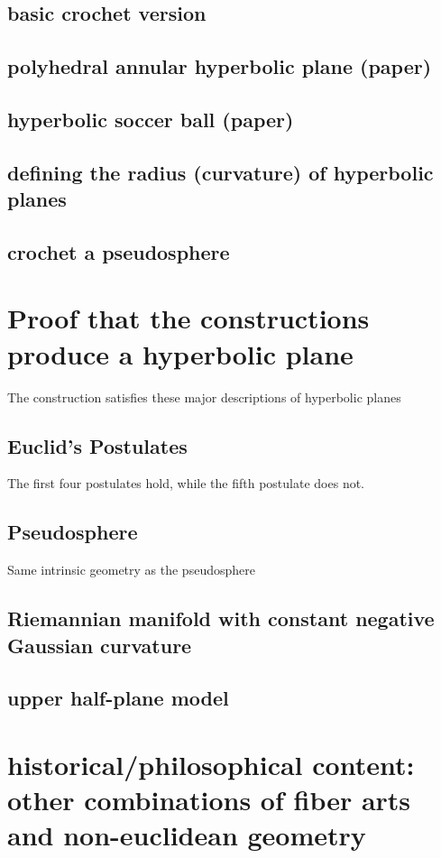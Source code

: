 \documentclass{article}
\begin{document}
\subsection{basic crochet version}
\subsection{polyhedral annular hyperbolic plane (paper)}
\subsection{hyperbolic soccer ball (paper)}
\subsection{defining the radius (curvature) of hyperbolic planes}
\subsection{crochet a pseudosphere}

\section{Proof that the constructions produce a hyperbolic plane}
The construction satisfies these major descriptions of hyperbolic planes
\subsection{Euclid's Postulates}
The first four postulates hold, while the fifth postulate does not.
\subsection{Pseudosphere}
Same intrinsic geometry as the pseudosphere
\subsection{Riemannian manifold with constant negative Gaussian curvature}
\subsection{upper half-plane model}

\section{historical/philosophical content: other combinations of fiber arts and non-euclidean geometry}
\end{document}

